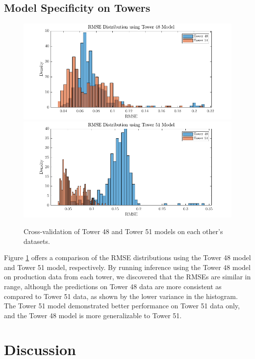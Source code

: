 \subsection{Model Specificity on Towers}

\begin{figure}[ht!]
    \centering
    \includegraphics[width=\textwidth]{figures/model48_errors.png}
    \includegraphics[width=\textwidth]{figures/model51_errors.png}
    \caption{Cross-validation of Tower 48 and Tower 51 models on each other's datasets.}
    \label{fig:tower_rmse}
\end{figure}

Figure \ref{fig:tower_rmse} offers a comparison of the RMSE distributions using the Tower 48 model and Tower 51 model, respectively. By running inference using the Tower 48 model on production data from each tower, we discovered that the RMSEs are similar in range, although the predictions on Tower 48 data are more consistent as compared to Tower 51 data, as shown by the lower variance in the histogram. The Tower 51 model demonstrated better performance on Tower 51 data only, and the Tower 48 model is more generalizable to Tower 51. 

\section{Discussion}


